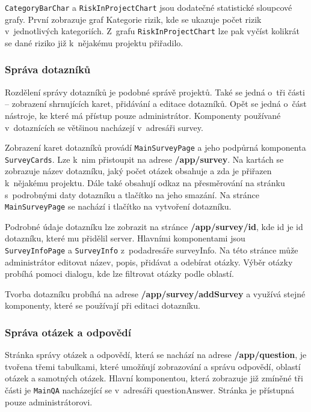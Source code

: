 \texttt{CategoryBarChar} a \texttt{RiskInProjectChart} jsou dodatečné statistické sloupcové grafy. První zobrazuje graf Kategorie rizik, kde se ukazuje počet rizik v~jednotlivých kategoriích. Z~grafu \texttt{RiskInProjectChart} lze pak vyčíst kolikrát se dané riziko již k~nějakému projektu přiřadilo.



\subsubsection *{Správa dotazníků}

Rozdělení správy dotazníků je podobné správě projektů. Také se jedná o~tři části – zobrazení shrnujících karet, přidávání a editace dotazníků. Opět se jedná o~část nástroje, ke které má přístup pouze administrátor. Komponenty používané v~dotaznících se většinou nacházejí v~adresáři survey.

Zobrazení karet dotazníků provádí \texttt{MainSurveyPage} a jeho podpůrná komponenta \texttt{Sur\-veyCards}. Lze k~nim přistoupit na adrese \textbf{/app/survey}. Na kartách se zobrazuje název dotazníku, jaký počet otázek obsahuje a zda je přiřazen k~nějakému projektu. Dále také obsahují odkaz na přesměrování na stránku s~podrobnými daty dotazníku a tlačítko na jeho smazání. Na stránce \texttt{MainSurveyPage} se nachází i tlačítko na vytvoření dotazníku.

Podrobné údaje dotazníku lze zobrazit na stránce \textbf{/app/survey/id}, kde id je id dotazníku, které mu přidělil server. Hlavními komponentami jsou \texttt{SurveyInfoPage} a \texttt{SurveyInfo} z~podadresáře surveyInfo. Na této stránce může administrátor editovat název, popis, přidávat a odebírat otázky. Výběr otázky probíhá pomoci dialogu, kde lze filtrovat otázky podle oblastí.

Tvorba dotazníku probíhá na adrese \textbf{/app/survey/addSurvey} a využívá stejné komponenty, které se používají při editaci dotazníku. 


\subsubsection *{Správa otázek a odpovědí}

Stránka správy otázek a odpovědí, která se nachází na adrese \textbf{/app/question}, je tvořena třemi tabulkami, které umožňují zobrazování a správu odpovědí, oblastí otázek a samotných otázek. Hlavní komponentou, která zobrazuje již zmíněné tři části je \texttt{MainQA} nacházející se v~adresáři questionAnswer. Stránka je přístupná pouze administrátorovi. 

